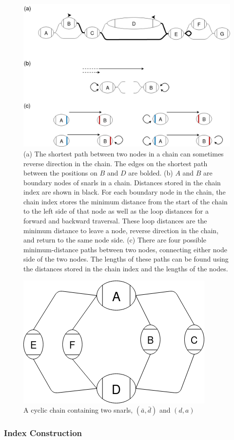 \documentclass[11pt]{ucscthesis}
\begin{document}
\begin{figure}[H]
    \centering
    \includegraphics[width=0.75\columnwidth]{aim1_chain_dists.png}
    \caption[Chain distances]{
    (a) The shortest path between two nodes in a chain can sometimes reverse direction in the chain. The edges on the shortest path between the positions on $B$ and $D$ are bolded.
    (b) $A$ and $B$ are boundary nodes of snarls in a chain. Distances stored in the chain index are shown in black. For each boundary node in the chain, the chain index stores the minimum distance from the start of the chain to the left side of that node as well as the loop distances for a forward and backward traversal. These loop distances are the minimum distance to leave a node, reverse direction in the chain, and return to the same node side.
    (c) There are four possible minimum-distance paths between two nodes, connecting either node side of the two nodes. The lengths of these paths can be found using the distances stored in the chain index and the lengths of the nodes.}
    \label{fig:aim1_chain_dists}
\end{figure}

\begin{figure}[H]
    \centering
    \includegraphics[width=0.25\columnwidth]{aim1_cyclic_chain.png}
    \caption[Cyclic chain]{A cyclic chain containing two snarls, $(\bar{a}, \bar{d})$ and $(d, a)$  }
    \label{fig:aim1_cyclic_chain}
\end{figure}


\subsubsection{Index Construction}
\end{document}

